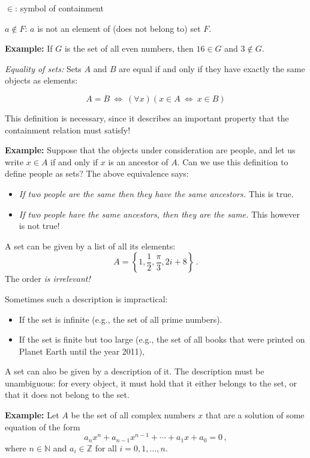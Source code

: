 \documentclass[11pt,paper=b5,footinclude,headinclude]{scrbook} %
\def\cee {{~\Leftrightarrow~}}
\theoremstyle{remark}
\theoremstyle{definition} %
\theoremstyle{theorem} %
\begin{document}
$\in$: symbol of containment

$a\not\in F$: $a$ is not an element of (does not belong to) set $F$.

\textbf{ Example:}
If $G$ is the set of all even numbers, then $16\in G$ and $3\not\in G$.


\medskip
{\em Equality of sets:} Sets $A$ and $B$ are equal if and only if they have exactly the same objects as elements:

$$A = B \cee (\forall x) (x\in A\cee x\in B)$$

\medskip
This definition is necessary, since it describes an important property that the containment relation must satisfy!

\medskip

\textbf{ Example:} Suppose that the objects under consideration are people, and
let us write $x\in A$ if and only if $x$ is an ancestor of  $A$.
Can we use this definition to define people as sets?
The above equivalence says:
\begin{itemize}
  \item {\em If two people are the same then they have the same ancestors.} This is true.
  \item {\em If two people have the same ancestors, then they are the same.} This however is not true!
\end{itemize}

\bigskip
A set can be given by a list of all its elements:
$$A = \left\{1,\frac{1}{2}, \frac{\pi}{3}, 2i+8\right\}\,.$$
The order {\em is irrelevant!}

\medskip
Sometimes such a description is impractical:
\begin{itemize}
  \item If the set is infinite (e.g., the set of all prime numbers).
  \item If the set is finite but too large (e.g., the set of all books that were printed on Planet Earth until the year 2011),
\end{itemize}

\medskip
A set can also be given by a description of it. The description must be unambiguous:
for every object, it must hold that it either belongs to the set, or that it does not belong to the set.

\medskip
\textbf{ Example:} Let $A$ be the set of all complex numbers  $x$ that are a solution of some equation of the form
$$a_nx^n+a_{n-1}x^{n-1}+\cdots+a_1x+a_0 = 0\,,$$
where $n\in \mathbb{N}$ and $a_i\in \mathbb{Z}$ for all $i= 0,1,\ldots, n$.
\end{document}
